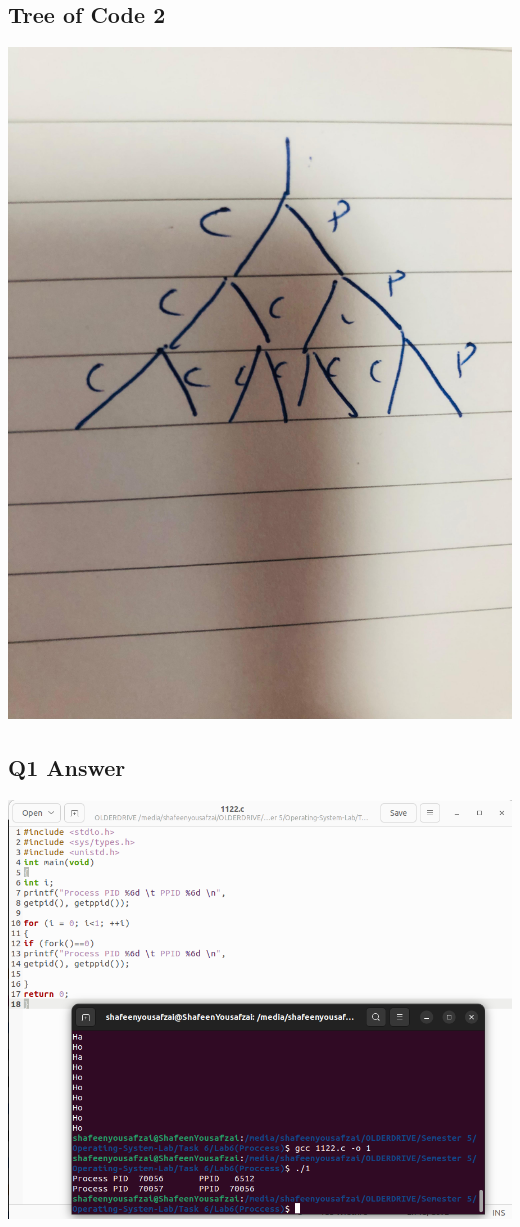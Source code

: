 \documentclass[12pt]{article}
\begin{document}
\subsection{Tree of Code 2}
    \includegraphics[width=\textwidth]{Untitled1.jpeg}



\subsection{Q1 Answer}
  \includegraphics[width=\textwidth]{Screenshot from 2024-09-27 05-46-26.png}   
\end{document}
